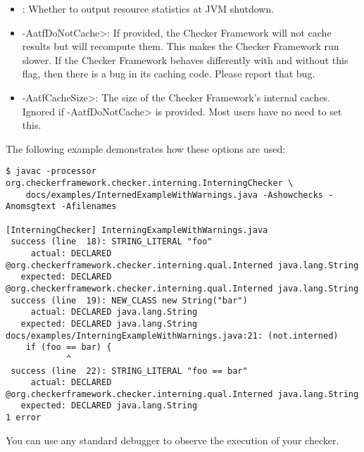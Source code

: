 \begin{itemize}

\item {}:
  Whether to output resource statistics at JVM shutdown.

\item \<-AatfDoNotCache>:
  If provided, the Checker Framework will not cache results but will
  recompute them.  This makes the Checker Framework run slower.  If the
  Checker Framework behaves differently with and without this flag, then
  there is a bug in its caching code.  Please report that bug.

\item \<-AatfCacheSize>:
  The size of the Checker Framework's internal caches.
  Ignored if \<-AatfDoNotCache> is provided.
  Most users have no need to set this.

\end{itemize}



The following example demonstrates how these options are used:

\begin{smaller}
\begin{Verbatim}
$ javac -processor org.checkerframework.checker.interning.InterningChecker \
    docs/examples/InternedExampleWithWarnings.java -Ashowchecks -Anomsgtext -Afilenames

[InterningChecker] InterningExampleWithWarnings.java
 success (line  18): STRING_LITERAL "foo"
     actual: DECLARED @org.checkerframework.checker.interning.qual.Interned java.lang.String
   expected: DECLARED @org.checkerframework.checker.interning.qual.Interned java.lang.String
 success (line  19): NEW_CLASS new String("bar")
     actual: DECLARED java.lang.String
   expected: DECLARED java.lang.String
docs/examples/InterningExampleWithWarnings.java:21: (not.interned)
    if (foo == bar) {
            ^
 success (line  22): STRING_LITERAL "foo == bar"
     actual: DECLARED @org.checkerframework.checker.interning.qual.Interned java.lang.String
   expected: DECLARED java.lang.String
1 error
\end{Verbatim}
\end{smaller}


You can use any standard debugger to observe the execution of your checker.

